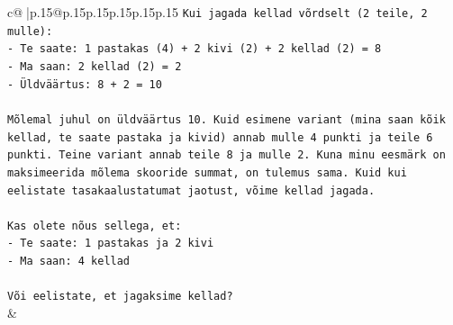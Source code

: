 \documentclass{article}
\begin{document}
{\begin{supertabular}{c@{$\;$}|p{.15\linewidth}@{}p{.15\linewidth}p{.15\linewidth}p{.15\linewidth}p{.15\linewidth}p{.15\linewidth}}
{{{\texttt{Kui jagada kellad võrdselt (2 teile, 2 mulle):} \\
\texttt{{-} Te saate: 1 pastakas (4) + 2 kivi (2) + 2 kellad (2) = 8} \\
\texttt{{-} Ma saan: 2 kellad (2) = 2} \\
\texttt{{-} Üldväärtus: 8 + 2 = 10} \\
\\ 
\texttt{Mõlemal juhul on üldväärtus 10. Kuid esimene variant (mina saan kõik kellad, te saate pastaka ja kivid) annab mulle 4 punkti ja teile 6 punkti. Teine variant annab teile 8 ja mulle 2. Kuna minu eesmärk on maksimeerida mõlema skooride summat, on tulemus sama. Kuid kui eelistate tasakaalustatumat jaotust, võime kellad jagada.} \\
\\ 
\texttt{Kas olete nõus sellega, et:} \\
\texttt{{-} Te saate: 1 pastakas ja 2 kivi} \\
\texttt{{-} Ma saan: 4 kellad} \\
\\ 
\texttt{Või eelistate, et jagaksime kellad?} \\
            }
        }
    }
    & \\ \\


\end{supertabular}}
\end{document}
